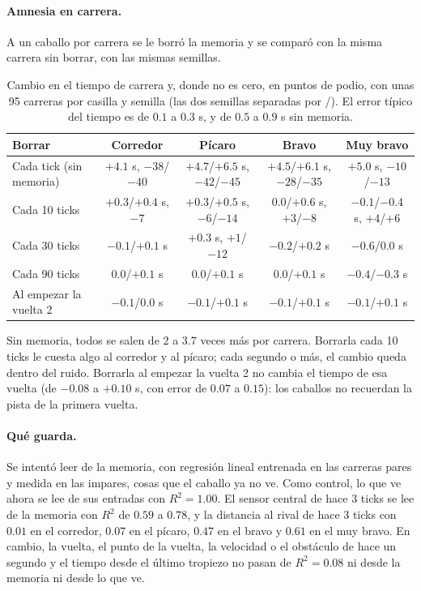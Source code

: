 \documentclass[11pt,letterpaper]{article}
\begin{document}
\paragraph{Amnesia en carrera.} A un caballo por carrera se le borró la memoria y se comparó con la misma carrera sin borrar, con las mismas semillas.
\begin{table}[h]\centering\footnotesize\setlength{\tabcolsep}{4pt}
\begin{tabular}{lcccc}
\toprule
Borrar & Corredor & Pícaro & Bravo & Muy bravo \\
\midrule
Cada tick (sin memoria) & $+4.1$ s, $-38$/$-40$ & $+4.7$/$+6.5$ s, $-42$/$-45$ & $+4.5$/$+6.1$ s, $-28$/$-35$ & $+5.0$ s, $-10$/$-13$ \\
Cada 10 ticks & $+0.3$/$+0.4$ s, $-7$ & $+0.3$/$+0.5$ s, $-6$/$-14$ & $0.0$/$+0.6$ s, $+3$/$-8$ & $-0.1$/$-0.4$ s, $+4$/$+6$ \\
Cada 30 ticks & $-0.1$/$+0.1$ s & $+0.3$ s, $+1$/$-12$ & $-0.2$/$+0.2$ s & $-0.6$/$0.0$ s \\
Cada 90 ticks & $0.0$/$+0.1$ s & $0.0$/$+0.1$ s & $0.0$/$+0.1$ s & $-0.4$/$-0.3$ s \\
Al empezar la vuelta 2 & $-0.1$/$0.0$ s & $-0.1$/$+0.1$ s & $-0.1$/$+0.1$ s & $-0.1$/$+0.1$ s \\
\bottomrule
\end{tabular}
\caption{Cambio en el tiempo de carrera y, donde no es cero, en puntos de podio, con unas 95 carreras por casilla y semilla (las dos semillas separadas por /). El error típico del tiempo es de $0.1$ a $0.3$ s, y de $0.5$ a $0.9$ s sin memoria.}
\end{table}
Sin memoria, todos se salen de $2$ a $3.7$ veces más por carrera. Borrarla cada 10 ticks le cuesta algo al corredor y al pícaro; cada segundo o más, el cambio queda dentro del ruido. Borrarla al empezar la vuelta 2 no cambia el tiempo de esa vuelta (de $-0.08$ a $+0.10$ s, con error de $0.07$ a $0.15$): los caballos no recuerdan la pista de la primera vuelta.

\paragraph{Qué guarda.} Se intentó leer de la memoria, con regresión lineal entrenada en las carreras pares y medida en las impares, cosas que el caballo ya no ve. Como control, lo que ve ahora se lee de sus entradas con $R^2 = 1.00$. El sensor central de hace 3 ticks se lee de la memoria con $R^2$ de $0.59$ a $0.78$, y la distancia al rival de hace 3 ticks con $0.01$ en el corredor, $0.07$ en el pícaro, $0.47$ en el bravo y $0.61$ en el muy bravo. En cambio, la vuelta, el punto de la vuelta, la velocidad o el obstáculo de hace un segundo y el tiempo desde el último tropiezo no pasan de $R^2 = 0.08$ ni desde la memoria ni desde lo que ve.
\end{document}
